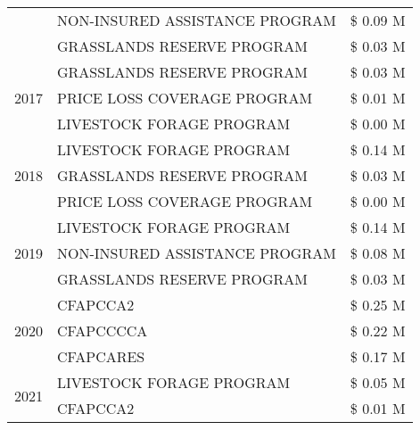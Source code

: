 \begin{tabular}{llr}
 & NON-INSURED ASSISTANCE PROGRAM & \$ 0.09 M \\
 & GRASSLANDS RESERVE PROGRAM & \$ 0.03 M \\
\cline{1-3}
\multirow[t]{3}{*}{2017} & GRASSLANDS RESERVE PROGRAM & \$ 0.03 M \\
 & PRICE LOSS COVERAGE PROGRAM & \$ 0.01 M \\
 & LIVESTOCK FORAGE PROGRAM & \$ 0.00 M \\
\cline{1-3}
\multirow[t]{3}{*}{2018} & LIVESTOCK FORAGE PROGRAM & \$ 0.14 M \\
 & GRASSLANDS RESERVE PROGRAM & \$ 0.03 M \\
 & PRICE LOSS COVERAGE PROGRAM & \$ 0.00 M \\
\cline{1-3}
\multirow[t]{3}{*}{2019} & LIVESTOCK FORAGE PROGRAM & \$ 0.14 M \\
 & NON-INSURED ASSISTANCE PROGRAM & \$ 0.08 M \\
 & GRASSLANDS RESERVE PROGRAM & \$ 0.03 M \\
\cline{1-3}
\multirow[t]{3}{*}{2020} & CFAPCCA2 & \$ 0.25 M \\
 & CFAPCCCCA & \$ 0.22 M \\
 & CFAPCARES & \$ 0.17 M \\
\cline{1-3}
\multirow[t]{2}{*}{2021} & LIVESTOCK FORAGE PROGRAM & \$ 0.05 M \\
 & CFAPCCA2 & \$ 0.01 M \\
\cline{1-3}
\bottomrule
\end{tabular}
